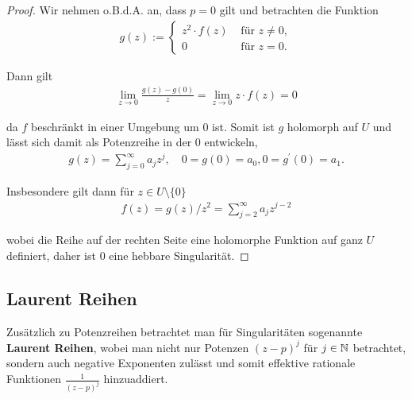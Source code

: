 \begin{proof}
 Wir nehmen o.B.d.A. an, dass \(p=0\) gilt und betrachten die Funktion
\begin{align*}
g(z) :=
\begin{cases}
z^2\cdot f(z)&\text{ für } z\neq 0,\\
0&\text{ für } z=0.
\end{cases}
\end{align*}
\par
Dann gilt
\begin{align*}
\lim_{z\to 0} \frac{g(z) - g(0)}{z} = \lim_{z\to 0} z\cdot f(z) =0
\end{align*}
\par
da \(f\) beschränkt in einer Umgebung um \(0\) ist. Somit ist \(g\) holomorph auf \(U\) und lässt sich damit als Potenzreihe in der \(0\) entwickeln,
\begin{align*}
g(z) = \sum_{j=0}^\infty a_j z^j,\quad 0 = g(0) = a_0, 0=g^\prime(0)=a_1.
\end{align*}
\par
Insbesondere gilt dann für \(z\in U\setminus\{0\}\)
\begin{align*}
f(z) = g(z)/z^2 = \sum_{j=2}^\infty a_j z^{j-2}
\end{align*}
\par
wobei die Reihe auf der rechten Seite eine holomorphe Funktion auf ganz \(U\) definiert, daher ist \(0\) eine hebbare Singularität.
\end{proof}


\subsection{Laurent Reihen}
\label{\detokenize{complexanalysis/residuensatz:laurent-reihen}}
\par
Zusätzlich zu Potenzreihen betrachtet man für Singularitäten sogenannte \textbf{Laurent Reihen}, wobei man nicht nur Potenzen \((z-p)^j\) für \(j\in \mathbb{N}\) betrachtet, sondern auch negative Exponenten zulässt und somit effektive rationale Funktionen \(\frac{1}{(z-p)^j}\) hinzuaddiert.

